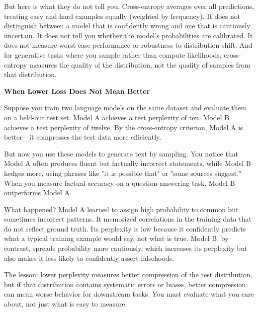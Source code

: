 \vspace{0.3cm}

But here is what they do not tell you. Cross-entropy averages over all predictions, treating easy and hard examples equally (weighted by frequency). It does not distinguish between a model that is confidently wrong and one that is cautiously uncertain. It does not tell you whether the model's probabilities are calibrated. It does not measure worst-case performance or robustness to distribution shift. And for generative tasks where you sample rather than compute likelihoods, cross-entropy measures the quality of the distribution, not the quality of samples from that distribution.

\vspace{1.5em}

\begin{examplebox}
\textbf{When Lower Loss Does Not Mean Better}

\vspace{0.5em}

Suppose you train two language models on the same dataset and evaluate them on a held-out test set. Model A achieves a test perplexity of ten. Model B achieves a test perplexity of twelve. By the cross-entropy criterion, Model A is better---it compresses the test data more efficiently.

\vspace{0.5em}

But now you use these models to generate text by sampling. You notice that Model A often produces fluent but factually incorrect statements, while Model B hedges more, using phrases like "it is possible that" or "some sources suggest." When you measure factual accuracy on a question-answering task, Model B outperforms Model A.

\vspace{0.5em}

What happened? Model A learned to assign high probability to common but sometimes incorrect patterns. It memorized correlations in the training data that do not reflect ground truth. Its perplexity is low because it confidently predicts what a typical training example would say, not what is true. Model B, by contrast, spreads probability more cautiously, which increases its perplexity but also makes it less likely to confidently assert falsehoods.

\vspace{0.5em}

The lesson: lower perplexity measures better compression of the test distribution, but if that distribution contains systematic errors or biases, better compression can mean worse behavior for downstream tasks. You must evaluate what you care about, not just what is easy to measure.
\end{examplebox}

